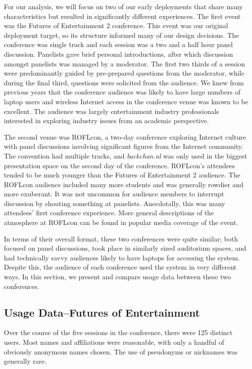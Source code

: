 For our analysis, we will focus on two of our early deployments that share many characteristics but resulted in significantly different experiences. The first event was the Futures of Entertainment 2 conference. This event was our original deployment target, so its structure informed many of our design decisions. The conference was single track and each session was a two and a half hour panel discussion. Panelists gave brief personal introductions, after which discussion amongst panelists was managed by a moderator. The first two thirds of a session were predominantly guided by pre-prepared questions from the moderator, while during the final third, questions were solicited from the audience. We knew from previous years that the conference audience was likely to have large numbers of laptop users and wireless Internet access in the conference venue was known to be excellent. The audience was largely entertainment industry professionals interested in exploring industry issues from an academic perspective.

The second venue was ROFLcon, a two-day conference exploring Internet culture with panel discussions involving significant figures from the Internet community. The convention had multiple tracks, and \emph{backchan.nl} was only used in the biggest presentation space on the second day of the conference. ROFLcon's attendees tended to be much younger than the Futures of Entertainment 2 audience. The ROFLcon audience included many more students and was generally rowdier and more exuberant. It was not uncommon for audience members to interrupt discussion by shouting something at panelists. Anecdotally, this was many attendees' first conference experience. More general descriptions of the atmosphere at ROFLcon can be found in popular media coverage of the event. \citep{Raftery:2008vd}

In terms of their overall format, these two conferences were quite similar; both focused on panel discussions, took place in similarly sized auditorium spaces, and had technically savvy audiences likely to have laptops for accessing the system. Despite this, the audience of each conference used the system in very different ways. In this section, we present and compare usage data between these two conferences.

\subsection{Usage Data--Futures of Entertainment}
Over the course of the five sessions in the conference, there were 125 distinct users. Most names and affiliations were reasonable, with only a handful of obviously anonymous names chosen. The use of pseudonyms or nicknames was generally rare. 

